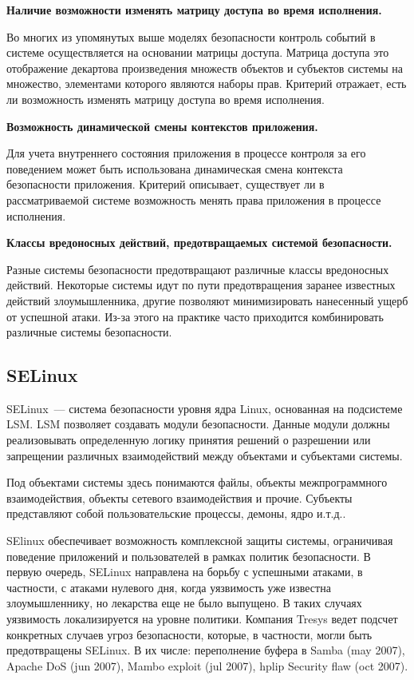 \bigskip
{\bfseries Наличие возможности изменять матрицу доступа 
	во время исполнения.}
	
	Во многих из упомянутых выше моделях безопасности 
	контроль событий в системе осуществляется на основании 
	матрицы доступа. Матрица доступа это отображение
	декартова произведения множеств объектов и субъектов 
	системы на множество, элементами которого являются 
	наборы прав.
	Критерий отражает, есть ли возможность изменять
	матрицу доступа во время исполнения. 

\bigskip 
{\bfseries Возможность динамической смены контекстов
	приложения.}
	
	Для учета внутреннего состояния приложения в 
	процессе контроля за его поведением может быть
	использована динамическая смена контекста безопасности 
	 приложения. 
	Критерий описывает, существует ли в рассматриваемой 
	системе возможность менять права приложения в процессе
	исполнения. 

\bigskip
{\bfseries Классы вредоносных действий, предотвращаемых 
	системой безопасности.}
	
	Разные системы безопасности предотвращают различные 
	классы вредоносных действий. Некоторые системы 
	идут по пути предотвращения заранее известных 
	действий злоумышленника, другие позволяют минимизировать 
	нанесенный ущерб от успешной атаки. Из-за этого на практике 
	часто приходится комбинировать различные системы безопасности.    

\bigskip
\subsection{SELinux} 
SELinux~--- система безопасности 
уровня ядра Linux, основанная на 
подсистеме LSM. LSM позволяет 
создавать модули безопасности. Данные модули 
должны реализовывать 
определенную логику принятия решений о 
разрешении или запрещении различных 
взаимодействий между объектами и субъектами 
системы. 

Под объектами системы здесь 
понимаются файлы, объекты межпрограммного 
взаимодействия, объекты сетевого взаимодействия 
и прочие. Субъекты представляют собой 
пользовательские процессы, демоны, ядро и.т.д..

SElinux обеспечивает возможность 
комплексной защиты системы, ограничивая поведение 
приложений и пользователей в рамках политик 
безопасности. В первую очередь, SELinux 
направлена на борьбу с успешными атаками, 
в частности, с атаками нулевого дня, когда 
уязвимость уже известна злоумышленнику, 
но лекарства еще не было выпущено. В таких 
случаях уязвимость локализируется на уровне 
политики. Компания Tresys ведет подсчет 
конкретных случаев угроз безопасности, которые, 
в частности, могли быть предотвращены SELinux. 
В их числе: переполнение буфера в Samba (may 
2007), Apache DoS (jun 2007), Mambo exploit (jul 
2007), hplip Security flaw (oct 2007). 


